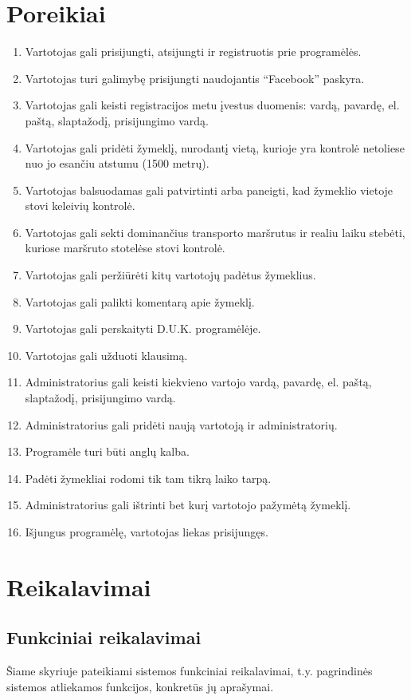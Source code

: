 \documentclass{VUMIFPSkursinis}
\begin{document}
\section{Poreikiai}
\begin{enumerate}[itemsep=-2mm]
	\item Vartotojas gali prisijungti, atsijungti ir registruotis prie programėlės.
	\item Vartotojas turi galimybę prisijungti naudojantis “Facebook” paskyra.
	\item Vartotojas gali keisti registracijos metu įvestus duomenis: vardą, pavardę, el. paštą, slaptažodį, prisijungimo vardą.
	\item Vartotojas gali pridėti žymeklį, nurodantį vietą, kurioje yra kontrolė netoliese nuo jo esančiu atstumu (1500 metrų).
	\item Vartotojas balsuodamas gali patvirtinti arba paneigti, kad žymeklio vietoje stovi keleivių kontrolė.
	\item Vartotojas gali sekti dominančius transporto maršrutus ir realiu laiku stebėti, kuriose maršruto stotelėse stovi kontrolė. 
	\item Vartotojas gali peržiūrėti kitų vartotojų padėtus žymeklius. 
	\item Vartotojas gali palikti komentarą apie žymeklį. 
	\item Vartotojas gali perskaityti D.U.K. programėlėje.
	\item Vartotojas gali užduoti klausimą.
	\item Administratorius gali keisti kiekvieno vartojo vardą, pavardę, el. paštą, slaptažodį, prisijungimo vardą.
	\item Administratorius gali pridėti naują vartotoją ir administratorių.
	\item Programėle turi būti anglų kalba. 
	\item Padėti žymekliai rodomi tik tam tikrą laiko tarpą.
	\item Administratorius gali ištrinti bet kurį vartotojo pažymėtą žymeklį.
	\item Išjungus programėlę, vartotojas liekas prisijungęs.
\end{enumerate} 

\section{Reikalavimai}
\subsection{Funkciniai reikalavimai }
Šiame skyriuje pateikiami sistemos funkciniai reikalavimai, t.y. pagrindinės sistemos atliekamos funkcijos, konkretūs jų aprašymai.
\end{document}
